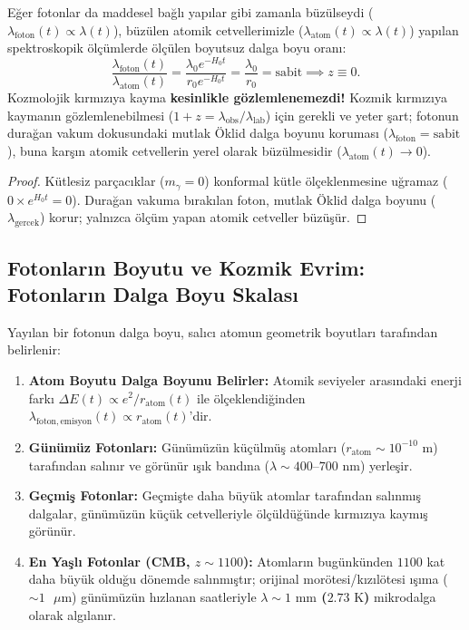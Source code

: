 \begin{theorem}
    \label{thm:kirmiziya_kayma_varlik_sarti}
    Eğer fotonlar da maddesel bağlı yapılar gibi zamanla büzülseydi ($\lambda_{\mathrm{foton}}(t) \propto \lambda(t)$), büzülen atomik cetvellerimizle ($\lambda_{\mathrm{atom}}(t) \propto \lambda(t)$) yapılan spektroskopik ölçümlerde ölçülen boyutsuz dalga boyu oranı:
    \begin{equation}
        \frac{\lambda_{\mathrm{foton}}(t)}{\lambda_{\mathrm{atom}}(t)} = \frac{\lambda_0 e^{-H_0 t}}{r_0 e^{-H_0 t}} = \frac{\lambda_0}{r_0} = \text{sabit} \implies z \equiv 0.
    \end{equation}
    Kozmolojik kırmızıya kayma \textbf{kesinlikle gözlemlenemezdi!} Kozmik kırmızıya kaymanın gözlemlenebilmesi ($1+z = \lambda_{\mathrm{obs}}/\lambda_{\mathrm{lab}}$) için gerekli ve yeter şart; fotonun durağan vakum dokusundaki mutlak Öklid dalga boyunu koruması ($\lambda_{\mathrm{foton}} = \text{sabit}$), buna karşın atomik cetvellerin yerel olarak büzülmesidir ($\lambda_{\mathrm{atom}}(t) \to 0$).
\end{theorem}

\begin{proof}
    Kütlesiz parçacıklar ($m_\gamma = 0$) konformal kütle ölçeklenmesine uğramaz ($0 \times e^{H_0 t} = 0$). Durağan vakuma bırakılan foton, mutlak Öklid dalga boyunu ($\lambda_{\text{gercek}}$) korur; yalnızca ölçüm yapan atomik cetveller büzüşür.
\end{proof}

\subsection{Fotonların Boyutu ve Kozmik Evrim: Fotonların Dalga Boyu Skalası}
\label{sec:fotonlar_neden_devasa_degil}

Yayılan bir fotonun dalga boyu, salıcı atomun geometrik boyutları tarafından belirlenir:
\begin{enumerate}
    \item \textbf{Atom Boyutu Dalga Boyunu Belirler:} Atomik seviyeler arasındaki enerji farkı $\Delta E(t) \propto e^2 / r_{\mathrm{atom}}(t)$ ile ölçeklendiğinden $\lambda_{\mathrm{foton, emisyon}}(t) \propto r_{\mathrm{atom}}(t)$'dir.
    \item \textbf{Günümüz Fotonları:} Günümüzün küçülmüş atomları ($r_{\mathrm{atom}} \sim 10^{-10}\text{ m}$) tarafından salınır ve görünür ışık bandına ($\lambda \sim 400\text{--}700\text{ nm}$) yerleşir.
    \item \textbf{Geçmiş Fotonlar:} Geçmişte daha büyük atomlar tarafından salınmış dalgalar, günümüzün küçük cetvelleriyle ölçüldüğünde kırmızıya kaymış görünür.
    \item \textbf{En Yaşlı Fotonlar (CMB, $z \sim 1100$):} Atomların bugünkünden $1100$ kat daha büyük olduğu dönemde salınmıştır; orijinal morötesi/kızılötesi ışıma ($\sim 1\text{ }\mu\mathrm{m}$) günümüzün hızlanan saatleriyle \textbf{$\lambda \sim 1\text{ mm}$ ($2.73\text{ K}$)} mikrodalga olarak algılanır.
\end{enumerate}
